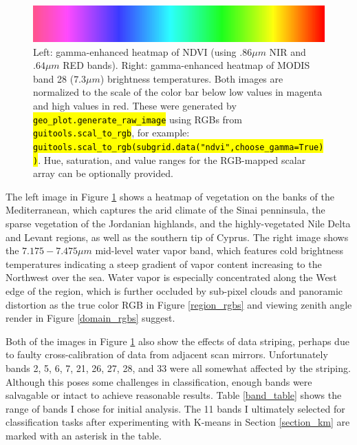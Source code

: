 \documentclass[12pt]{article}
\newcommand{\hltexttt}[1]{\texttt{\hl{#1}}}
\begin{document}
\begin{figure}[h!]
    \includegraphics[width=.3\paperwidth]{figs/hsv/cbar.png}

    \caption{Left: gamma-enhanced heatmap of NDVI (using $.86\mu m$ NIR and $.64\mu m$ RED bands). Right: gamma-enhanced heatmap of MODIS band 28 ($7.3\mu m$) brightness temperatures. Both images are normalized to the scale of the color bar below low values in magenta and high values in red. These were generated by \hltexttt{geo\_plot.generate\_raw\_image} using RGBs from \hltexttt{guitools.scal\_to\_rgb}, for example: \hltexttt{guitools.scal\_to\_rgb(subgrid.data("ndvi",choose\_gamma=True))}. Hue, saturation, and value ranges for the RGB-mapped scalar array can be optionally provided.}
    \label{hsv_ndvi_28}
\end{figure}

The left image in Figure \ref{hsv_ndvi_28} shows a heatmap of vegetation on the banks of the Mediterranean, which captures the arid climate of the Sinai penninsula, the sparse vegetation of the Jordanian highlands, and the highly-vegetated Nile Delta and Levant regions, as well as the southern tip of Cyprus. The right image shows the $7.175-7.475\mu m$ mid-level water vapor band, which features cold brightness temperatures indicating a steep gradient of vapor content increasing to the Northwest over the sea. Water vapor is especially concentrated along the West edge of the region, which is further occluded by sub-pixel clouds and panoramic distortion as the true color RGB in Figure \ref{region_rgbs} and viewing zenith angle render in Figure \ref{domain_rgbs} suggest.

Both of the images in Figure \ref{hsv_ndvi_28} also show the effects of data striping, perhaps due to faulty cross-calibration of data from adjacent scan mirrors. Unfortunately bands 2, 5, 6, 7, 21, 26, 27, 28, and 33 were all somewhat affected by the striping. Although this poses some challenges in classification, enough bands were salvagable or intact to achieve reasonable results. Table \ref{band_table} shows the range of bands I chose for initial analysis. The 11 bands I ultimately selected for classification tasks after experimenting with K-means in Section \ref{section_km} are marked with an asterisk in the table.
\end{document}
